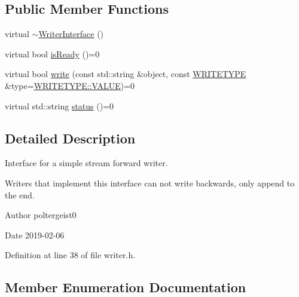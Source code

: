 \subsection*{Public Member Functions}
\begin{DoxyCompactItemize}
\item 
virtual \hyperlink{classWriterInterface_a4d53c1a520fca583d94ead3d656d5fc3}{$\sim$\+Writer\+Interface} ()
\item 
virtual bool \hyperlink{classWriterInterface_ada0c58dbea3bc216a1a687b070f2a924}{is\+Ready} ()=0
\item 
virtual bool \hyperlink{classWriterInterface_a2f756ac0b3299f4dbadececad4055424}{write} (const std\+::string \&object, const \hyperlink{classWriterInterface_af35706b761b016972144a9333637d93d}{W\+R\+I\+T\+E\+T\+Y\+PE} \&type=\hyperlink{classWriterInterface_af35706b761b016972144a9333637d93daecc2e9c313faddb07e7da223c1dc5c3f}{W\+R\+I\+T\+E\+T\+Y\+P\+E\+::\+V\+A\+L\+UE})=0
\item 
virtual std\+::string \hyperlink{classWriterInterface_a8865a526bb8c67ff4c96f25fc8217c81}{status} ()=0
\end{DoxyCompactItemize}


\subsection{Detailed Description}
Interface for a simple stream forward writer. 

Writers that implement this interface can not write backwards, only append to the end.

\begin{DoxyAuthor}{Author}
poltergeist0
\end{DoxyAuthor}
\begin{DoxyDate}{Date}
2019-\/02-\/06 
\end{DoxyDate}


Definition at line 38 of file writer.\+h.



\subsection{Member Enumeration Documentation}
\mbox{\label{classWriterInterface_af35706b761b016972144a9333637d93d}} 
